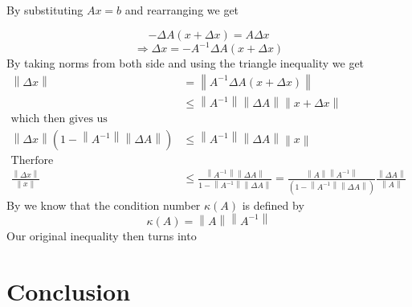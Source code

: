 \documentclass[12pt,reqno,twoside,titlepage]{article}
\newcommand{\norm}[1]{\left\lVert#1\right\rVert}
\theoremstyle{definition}
\theoremstyle{theorem}
\begin{document}
By substituting $Ax=b$ and rearranging  we get

$$-\Delta A(x+\Delta x)=A\Delta x$$
$$\Rightarrow \Delta x=-A^{-1}\Delta A(x+\Delta x)$$
By taking norms from both side and using the triangle inequality we get
\begin{align*}
\norm{\Delta x}&=\norm{A^{-1}\Delta A(x+\Delta x)}
\\ &\leq \norm{A^{-1}}\norm{\Delta A} \norm{x+ \Delta x}\\
\text{which then gives us}\\
\norm{\Delta x}(1-\norm{A^{-1}}\norm{\Delta A})&\leq\norm{A^{-1}}\norm{\Delta A}\norm{x}
\\\text{Therfore}\\
\frac{\norm{\Delta x}}{\norm{x}} &\leq\frac{\norm{A^{-1}}\norm{\Delta A}}{1-\norm{A^{-1}}\norm{\Delta A}}
=\frac{\norm{A}\norm{A^{-1}}}{(1-\norm{A^{-1}}\norm{\Delta A})}\frac{\norm{\Delta A}}{\norm{A}}
\end{align*}
By \cite{golub2012matrix} we know that the condition number $\kappa (A)$ is defined by
$$\kappa (A)=\norm{A}\norm{A^{-1}}$$
Our original inequality then turns into


\section{Conclusion}


\end{document}
